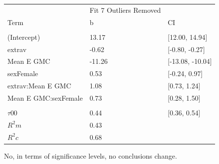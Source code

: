 \documentclass[]{article}
\begin{document}
\begin{tabular}{lll}
\toprule
\multicolumn{1}{c}{ } & \multicolumn{1}{c}{Fit 7 Outliers Removed} \\
\cmidrule(l{2pt}r{2pt}){2-2}
Term & b & CI\\
\midrule
\addlinespace[0.3em]
\multicolumn{3}{l}{\textbf{Fixed}}\\
\hspace{1em}(Intercept) & 13.17 & [12.00, 14.94]\\
\hspace{1em}extrav & -0.62 & [-0.80, -0.27]\\
\hspace{1em}Mean E GMC & -11.26 & [-13.08, -10.04]\\
\hspace{1em}sexFemale & 0.53 & [-0.24, 0.97]\\
\hspace{1em}extrav:Mean E GMC & 1.08 & [0.73, 1.24]\\
\hspace{1em}Mean E GMC:sexFemale & 0.73 & [0.28, 1.50]\\
\addlinespace[0.3em]
\multicolumn{3}{l}{\textbf{Random}}\\
\hspace{1em}$\tau {00}$ & 0.44 & [0.36, 0.54]\\
$R^2 m$ & 0.43 & \\
$R^2 c$ & 0.68 & \\
\bottomrule
\end{tabular}

No, in terms of significance levels, no conclusions change.
\end{document}
